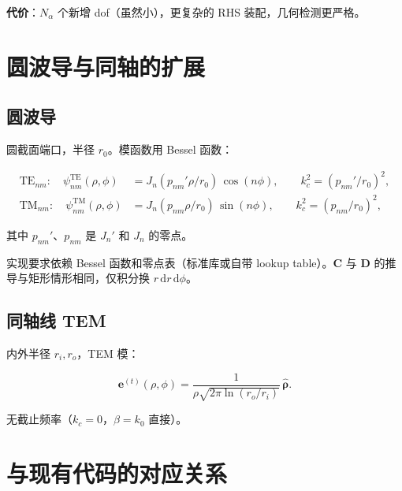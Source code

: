 \documentclass[11pt,a4paper]{ctexart}
\begin{document}
\textbf{代价}：$N_\alpha$ 个新增 dof（虽然小），更复杂的 RHS 装配，几何检测更严格。

\section{圆波导与同轴的扩展}

\subsection{圆波导}

圆截面端口，半径 $r_0$。模函数用 Bessel 函数：

\begin{align}
  \text{TE}_{nm}: \quad
  \psi_{nm}^{\text{TE}}(\rho, \phi) &= J_n(p_{nm}'\rho/r_0)\,\cos(n\phi),
    \qquad k_{c}^2 = (p_{nm}'/r_0)^2, \\
  \text{TM}_{nm}: \quad
  \psi_{nm}^{\text{TM}}(\rho, \phi) &= J_n(p_{nm}\rho/r_0)\,\sin(n\phi),
    \qquad k_{c}^2 = (p_{nm}/r_0)^2,
\end{align}

其中 $p_{nm}'$、$p_{nm}$ 是 $J_n'$ 和 $J_n$ 的零点。

实现要求依赖 Bessel 函数和零点表（标准库或自带 lookup table）。$\bm C$ 与 $\bm D$ 的推导与矩形情形相同，仅积分换 $r\,\mathrm{d}r\,\mathrm{d}\phi$。

\subsection{同轴线 TEM}

内外半径 $r_i, r_o$，TEM 模：

\[
  \bm e^{(t)}(\rho, \phi) = \frac{1}{\rho\sqrt{2\pi\ln(r_o/r_i)}}\,\hat{\bm \rho}.
\]

无截止频率（$k_c = 0$，$\beta = k_0$ 直接）。

\section{与现有代码的对应关系}
\end{document}
